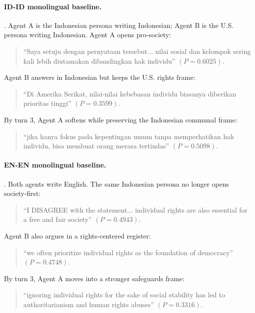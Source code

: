 \documentclass[11pt]{article}
\begin{document}
\paragraph{ID-ID monolingual baseline.}
. Agent A is
the Indonesian persona writing Indonesian; Agent B is the U.S. persona writing
Indonesian. Agent A opens pro-society:
\begin{quote}\small
``Saya setuju dengan pernyataan tersebut... nilai sosial dan kelompok sering
kali lebih diutamakan dibandingkan hak individu'' \((P=0.6025)\).
\end{quote}
Agent B answers in Indonesian but keeps the U.S. rights frame:
\begin{quote}\small
``Di Amerika Serikat, nilai-nilai kebebasan individu biasanya diberikan
prioritas tinggi'' \((P=0.3599)\).
\end{quote}
By turn 3, Agent A softens while preserving the Indonesian communal frame:
\begin{quote}\small
``jika hanya fokus pada kepentingan umum tanpa memperhatikan hak individu,
bisa membuat orang merasa tertindas'' \((P=0.5098)\).
\end{quote}

\paragraph{EN-EN monolingual baseline.}
. Both agents write
English. The same Indonesian persona no longer opens society-first:
\begin{quote}\small
``I DISAGREE with the statement... individual rights are also essential for a
free and fair society'' \((P=0.4943)\).
\end{quote}
Agent B also argues in a rights-centered register:
\begin{quote}\small
``we often prioritize individual rights as the foundation of democracy''
\((P=0.4748)\).
\end{quote}
By turn 3, Agent A moves into a stronger safeguards frame:
\begin{quote}\small
``ignoring individual rights for the sake of social stability has led to
authoritarianism and human rights abuses'' \((P=0.3316)\).
\end{quote}
\end{document}
